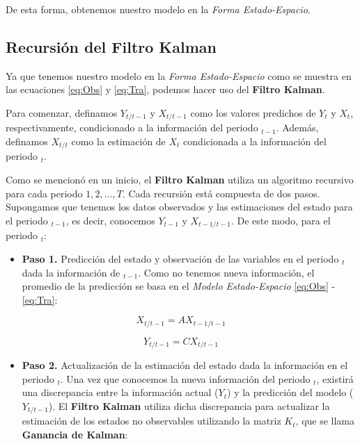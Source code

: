 \documentclass[
]{book}
\providecommand{\tightlist}{%
  \setlength{\itemsep}{0pt}\setlength{\parskip}{0pt}}
\begin{document}
De esta forma, obtenemos nuestro modelo en la \emph{Forma Estado-Espacio}.

\hypertarget{recursiuxf3n-del-filtro-kalman}{%
\subsection{Recursión del Filtro Kalman}\label{recursiuxf3n-del-filtro-kalman}}

Ya que tenemos nuestro modelo en la \emph{Forma Estado-Espacio} como se muestra en las ecuaciones \eqref{eq:Obs} y \eqref{eq:Tra}, podemos hacer uso del \textbf{Filtro Kalman}.

Para comenzar, definamos \(Y_{t/t-1}\) y \(X_{t/t-1}\) como los valores predichos de \(Y_t\) y \(X_t\), respectivamente, condicionado a la información del periodo \(_{t-1}\). Además, definamos \(X_{t/t}\) como la estimación de \(X_t\) condicionada a la información del periodo \(_t\).

Como se mencionó en un inicio, el \textbf{Filtro Kalman} utiliza un algoritmo recursivo para cada periodo \(1,2,...,T\). Cada recursión está compuesta de dos pasos. Supongamos que tenemos los datos observados y las estimaciones del estado para el periodo \(_{t-1}\), es decir, conocemos \(Y_{t-1}\) y \(X_{t-1/t-1}\). De este modo, para el periodo \(_t\):

\begin{itemize}
\tightlist
\item
  \textbf{Paso 1.} Predicción del estado y observación de las variables en el periodo \(_t\) dada la información de \(_{t-1}\). Como no tenemos nueva información, el promedio de la predicción se basa en el \emph{Modelo Estado-Espacio} \eqref{eq:Obs} - \eqref{eq:Tra}:
\end{itemize}

\begin{equation}
X_{t/t-1} = A X_{t-1/t-1}
\label{eq:Xt}
\end{equation}

\begin{equation}
Y_{t/t-1} = C X_{t/t-1}
\label{eq:Yt}
\end{equation}

\begin{itemize}
\tightlist
\item
  \textbf{Paso 2.} Actualización de la estimación del estado dada la información en el periodo \(_t\). Una vez que conocemos la nueva información del periodo \(_t\), existirá una discrepancia entre la información actual (\(Y_t\)) y la predicción del modelo (\(Y_{t/t-1}\)). El \textbf{Filtro Kalman} utiliza dicha discrepancia para actualizar la estimación de los estados no observables utilizando la matriz \(K_t\), que se llama \textbf{Ganancia de Kalman}:
\end{itemize}
\end{document}
